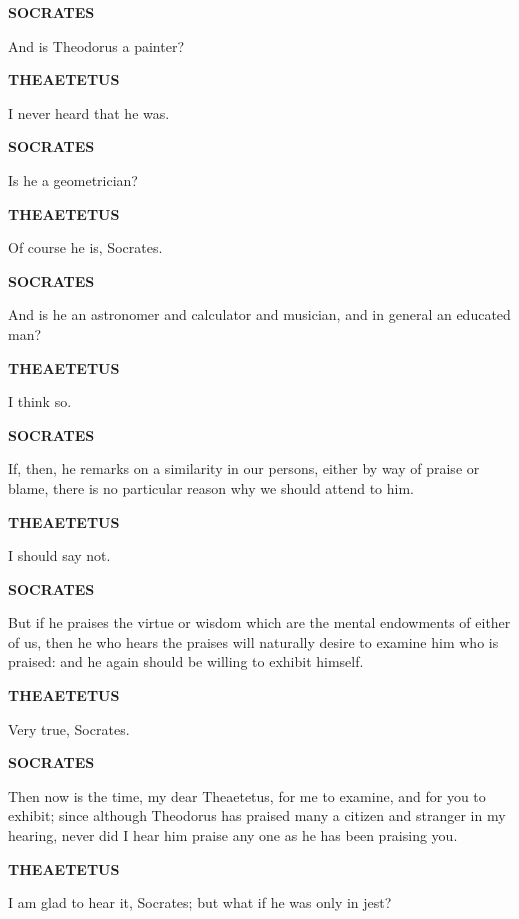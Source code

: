 \documentclass[11pt,letter]{article}
\begin{document}
\par \textbf{SOCRATES}
\par   And is Theodorus a painter?

\par \textbf{THEAETETUS}
\par   I never heard that he was.

\par \textbf{SOCRATES}
\par   Is he a geometrician?

\par \textbf{THEAETETUS}
\par   Of course he is, Socrates.

\par \textbf{SOCRATES}
\par   And is he an astronomer and calculator and musician, and in general an educated man?

\par \textbf{THEAETETUS}
\par   I think so.

\par \textbf{SOCRATES}
\par   If, then, he remarks on a similarity in our persons, either by way of praise or blame, there is no particular reason why we should attend to him.

\par \textbf{THEAETETUS}
\par   I should say not.

\par \textbf{SOCRATES}
\par   But if he praises the virtue or wisdom which are the mental endowments of either of us, then he who hears the praises will naturally desire to examine him who is praised:  and he again should be willing to exhibit himself.

\par \textbf{THEAETETUS}
\par   Very true, Socrates.

\par \textbf{SOCRATES}
\par   Then now is the time, my dear Theaetetus, for me to examine, and for you to exhibit; since although Theodorus has praised many a citizen and stranger in my hearing, never did I hear him praise any one as he has been praising you.

\par \textbf{THEAETETUS}
\par   I am glad to hear it, Socrates; but what if he was only in jest?
\end{document}
